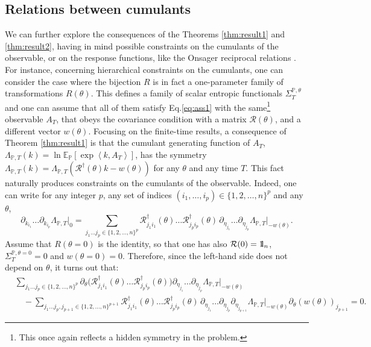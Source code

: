 \documentclass[a4paper,11pt]{article}
\numberwithin{equation}{section}
\newcommand{\bbbone}{\mathchoice {\rm 1\mskip-4mu l} {\rm 1\mskip-4mu l}
{\rm 1\mskip-4.5mu l} {\rm 1\mskip-5mu l}}
\begin{document}
\subsection{Relations between cumulants}  
\label{subsec:cumulants}


We can further explore the consequences of the Theorems \ref{thm:result1} and \ref{thm:result2}, having in mind possible constraints on the cumulants of the observable, or on the response functions, like the Onsager reciprocal relations \cite{dGM84,Str92,Str94}.
For instance, concerning hierarchical constraints on the cumulants, one can consider the case where the bijection $R$ is in fact a one-parameter family of transformations $R(\theta)$. This defines a family of scalar entropic functionals $\varSigma_{T}^{\mathbb{P},\theta}$ and one can assume that all of them satisfy Eq.\eqref{eq:ass1} with the same\footnote{This once again reflects a hidden symmetry in the problem.} observable $A_T$, that obeys the covariance condition with a matrix $\mathcal{R}(\theta)$, and a different vector $w(\theta)$. Focusing on the finite-time results, a consequence of Theorem \ref{thm:result1} is that the cumulant generating function of $A_T$, $\Lambda_{\mathbb{P},T}(k)= \ln \mathbb{E}_\mathbb{P} \left[\exp\left\langle k,A_T\right\rangle \right] $, has the symmetry $\Lambda_{\mathbb{P},T}(k)= \Lambda_{\mathbb{P},T}(\mathcal{R}^\dag (\theta) k -w(\theta)) $ for any $\theta$ and any time $T$.
This fact naturally produces constraints on the cumulants of the observable. Indeed, one can write for any integer $p$, any set of indices $(i_1,\ldots, i_p) \in \{1,2,\ldots,n \}^{p}$ and any $\theta$,
\begin{equation}
    \partial_{k_{i_1}}\ldots \partial_{k_{i_p}}\Lambda_{\mathbb{P},T} \Big|_{0} = \sum_{j_{1}\ldots j_{p}\in\{1,2,\ldots,n \}^{p}} \mathcal{R}^\dag_{j_1 i_1}(\theta) \ldots \mathcal{R}^\dag_{j_p i_p}(\theta) \,  \partial_{\eta_{j_1}}\ldots \partial_{\eta_{j_p}} \Lambda_{\mathbb{P},T} \Big|_{-w(\theta)} .
\end{equation}
Assume that $R({\theta=0})$ is the identity, so that one has also  $ \mathcal{R}(0)=\bbbone_n$,  $\varSigma_T^{\mathbb{P},\theta=0}=0$ and $w({\theta=0})=0$. 
Therefore, since the left-hand side does not depend on $\theta$, it turns out that: 
\begin{align}
 &\sum_{j_{1}\ldots j_{p}\in\{1,2,\ldots,n \}^{p}} \partial_\theta \Big( \mathcal{R}^\dag_{j_1 i_1}(\theta) \ldots \mathcal{R}^\dag_{j_p i_p}(\theta) \Big) \partial_{\eta_{j_1}}\ldots \partial_{\eta_{j_p}} \Lambda_{\mathbb{P},T} \Big|_{-w(\theta)} \nonumber \\
 &\quad - \sum_{j_{1}\ldots j_{p},j_{p+1}\in\{1,2,\ldots,n \}^{p+1}} \mathcal{R}^\dag_{j_1 i_1}(\theta) \ldots \mathcal{R}^\dag_{j_p i_p}(\theta) \, \partial_{\eta_{j_1}}\ldots \partial_{\eta_{j_p}} \partial_{\eta_{j_{p+1}}} \Lambda_{\mathbb{P},T} \Big|_{-w(\theta)} \partial_\theta (w(\theta))_{ j_{p+1}}  =0.
\end{align}
\end{document}
